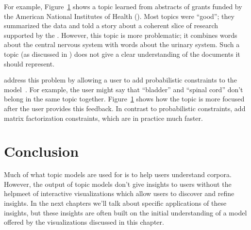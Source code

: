 For example, Figure~\ref{} shows a topic learned from abstracts of grants funded
by the American National Institutes of Health ().  Most topics were
``good''; they summarized the data and told a story about a coherent slice of
research supported by the .  However, this topic is more problematic;
it combines words about the central nervous system with words about the urinary
system.  Such a topic (as discussed in \citet{}) does not give a clear
understanding of the documents it should represent.

\citet{hu-14:itm} address this problem by allowing a user to add probabilistic
constraints to the model~\citep{boyd-graber-07,andrzejewski-09}.  For example,
the user might say that ``bladder'' and ``spinal cord'' don't belong in the same
topic together.  Figure~\ref{} shows how the topic is more focused after the
user provides this feedback.  In contrast to probabilistic constraints,
\citet{choo-13} add matrix factorization constraints, which are in practice much
faster.

\section{Conclusion}

Much of what topic models are used for is to help users understand corpora.
However, the output of topic models don't give insights to users without the
helpmeet of interactive visualizations which allow users to discover and
refine insights.  In the next chapters we'll talk about specific applications of
these insights, but these insights are often built on the initial understanding
of a model offered by the visualizations discussed in this chapter.